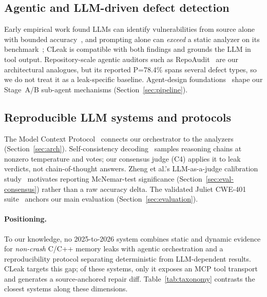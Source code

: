 \documentclass[a4paper]{llncs}
\begin{document}
\subsection{Agentic and LLM-driven defect detection}
Early empirical work found LLMs can identify vulnerabilities from
source alone with bounded accuracy~\cite{llm-vuln-eval}, and prompting
alone can \emph{exceed} a static analyzer on its
benchmark~\cite{llm-proxy-static}; CLeak is compatible with both
findings and grounds the LLM in tool output.
Repository-scale agentic auditors such as RepoAudit~\cite{repoaudit}
are our architectural analogues, but its reported P=78.4\% spans
several defect types, so we do not treat it as a leak-specific baseline.
Agent-design foundations~\cite{react}
shape our Stage~A/B sub-agent mechanisms (Section~\ref{sec:pipeline}).

\subsection{Reproducible LLM systems and protocols}
The Model Context Protocol~\cite{mcp} connects our orchestrator to the
analyzers (Section~\ref{sec:arch}). Self-consistency
decoding~\cite{selfconsistency} samples reasoning chains at nonzero
temperature and votes; our consensus judge (C4) applies it to leak
verdicts, not chain-of-thought answers. Zheng et al.'s LLM-as-a-judge
calibration study~\cite{llmjudge} motivates reporting McNemar-test
significance (Section~\ref{sec:eval-consensus}) rather than a raw
accuracy delta. The validated Juliet CWE-401
suite~\cite{juliet} anchors our main evaluation
(Section~\ref{sec:evaluation}).

\paragraph{Positioning.} To our knowledge, no 2025-to-2026 system
combines static and dynamic evidence for \emph{non-crash} C/C++ memory
leaks with agentic orchestration and a reproducibility protocol
separating deterministic from LLM-dependent results. CLeak targets this
gap; of these systems, only it exposes an MCP tool transport and
generates a source-anchored repair diff.
Table~\ref{tab:taxonomy} contrasts the closest systems along these
dimensions.
\end{document}
